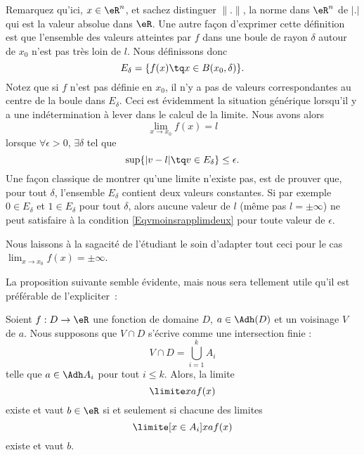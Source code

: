 Remarquez qu'ici, \( x\in\eR^n\), et sachez distinguer \( \| . \|\), la norme dans \( \eR^n\) de \( | . |\) qui est la valeur absolue dans \( \eR\). Une autre façon d'exprimer cette définition est que l'ensemble des valeurs atteintes par \( f\) dans une boule de rayon \( \delta\) autour de \( x_0\) n'est pas très loin de \( l\). Nous définissons donc
\begin{equation}
	E_{\delta}=\{ f(x)\tq x\in B(x_0,\delta) \}.
\end{equation}
Notez que si \( f\) n'est pas définie en \( x_0\), il n'y a pas de valeurs correspondantes au centre de la boule dans \( E_{\delta}\). Ceci est évidemment la situation générique lorsqu'il y a une indétermination à lever dans le calcul de la limite. Nous avons alors
\begin{equation}
	\lim_{x\to x_0}f(x)=l
\end{equation}
lorsque \( \forall\epsilon>0\), \( \exists\delta\) tel que
\begin{equation}        \label{Eqvmoinsrapplimdeux}
	\sup\{ | v-l |\tq v\in E_{\delta} \}\leq\epsilon.
\end{equation}
Une façon classique de montrer qu'une limite n'existe pas, est de prouver que, pour tout \( \delta\), l'ensemble \( E_{\delta}\) contient deux valeurs constantes. Si par exemple \( 0\in E_{\delta}\) et \( 1\in E_{\delta}\) pour tout \( \delta\), alors aucune valeur de \( l\) (même pas \( l=\pm\infty\)) ne peut satisfaire à la condition \eqref{Eqvmoinsrapplimdeux} pour toute valeur de \( \epsilon\).

Nous laissons à la sagacité de l'étudiant le soin d'adapter tout ceci pour le cas \( \lim_{x\to x_0}f(x)=\pm\infty\).

La proposition suivante semble évidente, mais nous sera tellement
utile qu'il est préférable de l'expliciter~:
\begin{proposition}     \label{PROPooPOAQooPmxEtb}
	Soient \( f : D \to \eR\) une fonction de domaine \( D\), \( a\in\Adh(D)\) et un voisinage \( V\) de \( a\). Nous supposons que \( V\cap D\) s'écrive comme une intersection finie :
	\begin{equation*}
		V\cap D = \bigcup_{i=1}^k A_i
	\end{equation*}
	telle que \( a \in \Adh A_i\) pour tout \( i \leq k\). Alors, la limite
	\begin{equation}      \label{EQooEXELooHccCGw}
		\limite x a f(x)
	\end{equation}
	existe et vaut \( b\in \eR\) si et seulement si chacune des limites
	\begin{equation}
		\limite[x \in A_i] x a f(x)
	\end{equation}
	existe et vaut \( b\).
\end{proposition}

